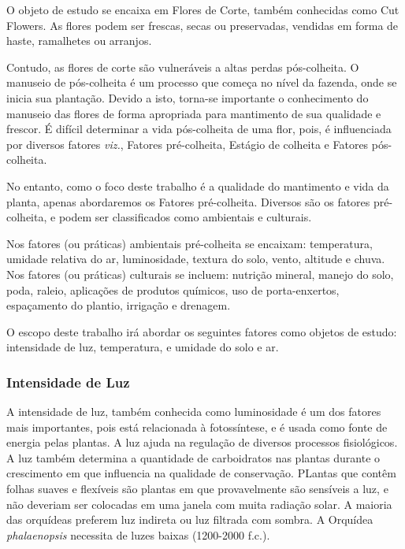 \documentclass[conference]{IEEEtran}
\begin{document}
O objeto de estudo se encaixa em Flores de Corte, também conhecidas como Cut Flowers. As flores podem ser frescas, secas ou preservadas, vendidas em forma de haste, ramalhetes ou arranjos. \cite{b2}

Contudo, as flores de corte são vulneráveis a altas perdas pós-colheita. O manuseio de pós-colheita é um processo que começa no nível da fazenda, onde se inicia sua plantação. Devido a isto, torna-se importante o conhecimento do manuseio das flores de forma apropriada para mantimento de sua qualidade e frescor. É difícil determinar a vida pós-colheita de uma flor, pois, é influenciada por diversos fatores {\itshape{viz.}}, Fatores pré-colheita, Estágio de colheita e Fatores pós-colheita.\cite{b1}

No entanto, como o foco deste trabalho é a qualidade do mantimento e vida da planta, apenas abordaremos os Fatores pré-colheita. Diversos são os fatores pré-colheita, e podem ser classificados como ambientais e culturais.\cite{b3}

Nos fatores (ou práticas) ambientais pré-colheita se encaixam: temperatura, umidade relativa do ar, luminosidade, textura do solo, vento, altitude e chuva. Nos fatores (ou práticas) culturais se incluem: nutrição mineral, manejo do solo, poda, raleio, aplicações de produtos químicos, uso de porta-enxertos, espaçamento do plantio, irrigação e drenagem.\cite{b3}

O escopo deste trabalho irá abordar os seguintes fatores como objetos de estudo: intensidade de luz, temperatura, e umidade do solo e ar.

\subsubsection{Intensidade de Luz}
A intensidade de luz, também conhecida como luminosidade é um dos fatores mais importantes, pois está relacionada à fotossíntese, e é usada como fonte de energia pelas plantas. A luz ajuda na regulação de diversos processos fisiológicos. A luz também determina a quantidade de carboidratos nas plantas durante o crescimento em que influencia na qualidade de conservação. PLantas que contêm folhas suaves e flexíveis são plantas em que provavelmente são sensíveis a luz, e não deveriam ser colocadas em uma janela com muita radiação solar. A maioria das orquídeas preferem luz indireta ou luz filtrada com sombra. A Orquídea {\itshape{phalaenopsis}} necessita de luzes baixas (1200-2000 f.c.). \cite{b3, b1, b4, b5}
\end{document}
